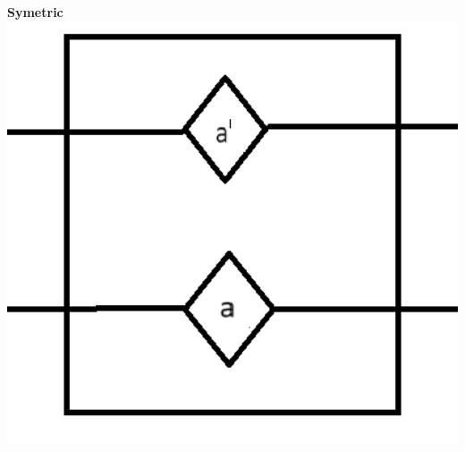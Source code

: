 \documentclass{beamer}
\begin{document}
\begin{frame}
\begin{minipage}[t]{0.32\textwidth}
  \end{minipage}
  \begin{minipage}[t]{0.232\textwidth}
    \textbf{Symetric}
    \includegraphics[width=1.3\textwidth]{res/SelfClosingSymetricDoor.png}
  \end{minipage}

\end{frame}
\end{document}
